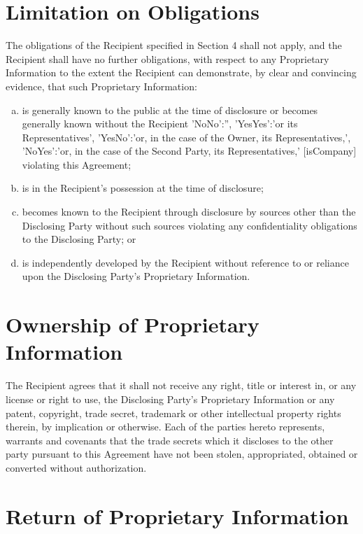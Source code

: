 \documentclass[12pt]{article}
\newcommand{\VAR}[1]{{\color{blue}#1}}
\newcommand{\representativesMention}[1]{
    \VAR{
        {
            'NoNo':'',
            'YesYes':'#1 its Representatives',
            'YesNo':'#1, in the case of the Owner, its Representatives,',
            'NoYes':'#1, in the case of the Second Party, its Representatives,'
        }[isCompany]
    }
}
\begin{document}
\section{Limitation on Obligations} \label{sec:limitOblig}
The obligations of the Recipient specified in Section 4 shall not apply, and the Recipient shall have no further obligations, with respect to any Proprietary Information to the extent the Recipient can demonstrate, by clear and convincing evidence, that such Proprietary Information:
\begin{enumerate}[a)]
\item is generally known to the public at the time of disclosure or becomes generally known without the Recipient \representativesMention{or} violating this Agreement;
\item  is in the Recipient’s possession at the time of disclosure;
\item becomes known to the Recipient through disclosure by sources other than the Disclosing Party without such sources violating any confidentiality obligations to the Disclosing Party; or
\item is independently developed by the Recipient without reference to or reliance upon the Disclosing Party's Proprietary Information.
\end{enumerate}

\section{Ownership of Proprietary Information}
The Recipient agrees that it shall not receive any right, title or interest in, or any license or right to use, the Disclosing Party's Proprietary Information or any patent, copyright, trade secret, trademark or other intellectual property rights therein, by implication or otherwise.
Each of the parties hereto represents, warrants and covenants that the trade secrets which it discloses to the other party pursuant to this Agreement have not been stolen, appropriated, obtained or converted without authorization.

\section{Return of Proprietary Information}
\end{document}

